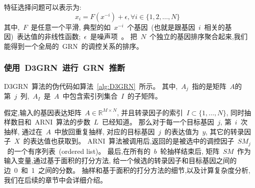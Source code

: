 特征选择问题可以表示为:
\begin{equation}
\label{eq:fs}
x_i =  F(x^{-i}) + \epsilon , \forall i \in \{1,2,\ldots,N\}
\end{equation}
其中,~$F$~是任意一个平滑, 典型的如~$x^{-i}$~个基因~(也就是跟基因~$i$~相关的基因)~表达值的非线性函数;~$\epsilon$~是噪声项~\cite{huynh2010inferring,Haury2012}。
把~$N$~个独立的基因排序聚合起来,我们能得到一个全局的~GRN~的调控关系的排序。

\subsubsection{使用~D3GRN~进行~GRN~推断}

D3GRN~算法的伪代码如算法~\ref{alg:D3GRN}~所示。
其中,~$A_j$~指的是矩阵~$A$的第~$j$~列,~$A_I$~是~$A$~中包含索引列集合~$I$~的子矩阵。

假定,输入的基因表达矩阵~$A \in \mathbb{R}^{M \times N}$, 
并且转录因子的索引~$I \subset \{1,\ldots,N\}$, 
同时抽样数目和~ARNI~算法的步数~$L$~已经知道。
那么对于每一个目标基因~$j$, 第~$i$~次抽样,
通过在~$A$~中放回重复抽样,
对应的目标基因~$j$~的表达值为~$y$, 
其它的转录因子~$X$~的表达值也获取到。
ARNI~算法被调用后,返回的是被选中的调控因子~$SM_j$~的一个有序列表~(ordered list)。
最后,在所有的~$b$~轮抽样结束后,
矩阵~$SM$~作为输入变量,通过基于面积的打分方法,
给一个候选的转录因子和目标基因之间的边~0~和~1~之间的分数。
抽样和基于面积的打分方法的细节,以及计算复杂度分析,我们在后续的章节中会详细介绍。
 
